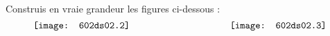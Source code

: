 Construis en vraie grandeur les figures ci-dessous :
\[\texttt{[image: 602ds02.2]}\kern0.3\linewidth\texttt{[image: 602ds02.3]}\]